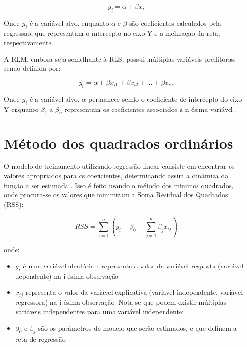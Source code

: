 \begin{equation}
	y_i = \alpha + \beta x_i 
\end{equation}

Onde $y_i$ é a variável alvo, enquanto $\alpha$ e $\beta$ são coeficientes calculados pela regressão, que representam o intercepto no eixo Y e a inclinação da reta, respectivamente.

A RLM, embora seja semelhante à RLS, possui múltiplas variáveis preditoras, sendo definida por:

\begin{equation}
	y_i = \alpha + \beta x_{i1} + \beta x_{i2} + ... + \beta x_{in}
\end{equation}

Onde $y_i$ é a variável alvo, $\alpha$ permanece sendo o coeficiente de intercepto do eixo Y enquanto $\beta_1$ a $\beta_n$ representam os coeficientes associados à n-ésima variável \cite{sassi2012}.

\section{Método dos quadrados ordinários}

O modelo de treinamento utilizando regressão linear consiste em  encontrar os valores apropriados para os coeficientes, determinando assim a dinâmica da função a ser estimada \cite{soczi2024}. Isso é feito usando o método dos mínimos quadrados, onde procura-se os valores que minimizam a Soma Residual dos Quadrados (RSS):

\begin{equation}
    RSS = \sum_{i=1}^{n} \left(y_i - \beta_0 - \sum_{j=1}^{p}\beta_jx_{ij}\right)
\end{equation}

onde:

\begin{itemize}
    \item $y_i$ é uma variável aleatória e representa o valor da variável resposta (variável dependente) na i-ésima observação
    \item $x_{ij}$ representa o valor da variável explicativa (variável independente, variável regressora) na i-ésima observação. Nota-se que podem existir múltiplas variáveis independentes para uma variável independente; 
    \item $\beta_{0}$ e $\beta_{j}$ são os parâmetros do modelo que serão estimados, e que definem a reta de regressão
\end{itemize}

